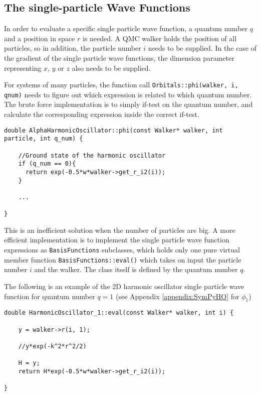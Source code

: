 \subsection{The single-particle Wave Functions}
\label{sec:optSPWFqnumIndie}

In order to evaluate a specific single particle wave function, a quantum number $q$ and a position in space $r$ is needed. A QMC walker holds the position of all particles, so in addition, the particle number $i$ needs to be supplied. In the case of the gradient of the single particle wave functions, the dimension parameter representing $x$, $y$ or $z$ also needs to be supplied.

For systems of many particles, the function call \verb+Orbitals::phi(walker, i, qnum)+ needs to figure out which expression is related to which quantum number. The brute force implementation is to simply if-test on the quantum number, and calculate the corresponding expression inside the correct if-test.

\vspace{0.5cm}
\begin{lstlisting}
double AlphaHarmonicOscillator::phi(const Walker* walker, int particle, int q_num) {
    
    //Ground state of the harmonic oscillator
    if (q_num == 0){
      return exp(-0.5*w*walker->get_r_i2(i));
    }
    
    ...
    
}
\end{lstlisting}

This is an inefficient solution when the number of particles are big. A more efficient implementation is to implement the single particle wave function expressions as \verb+BasisFunctions+ subclasses, which holds only one pure virtual member function \verb+BasisFunctions::eval()+ which takes on input the particle number $i$ and the walker. The class itself is defined by the quantum number $q$. 

The following is an example of the 2D harmonic oscillator single particle wave function for quantum number $q=1$ (see Appendix \ref{appendix:SymPyHO} for $\phi_1$)

\vspace{0.5cm}
\begin{lstlisting}
double HarmonicOscillator_1::eval(const Walker* walker, int i) {

    y = walker->r(i, 1);
    
    //y*exp(-k^2*r^2/2)
    
    H = y;
    return H*exp(-0.5*w*walker->get_r_i2(i));
    
}
\end{lstlisting}

